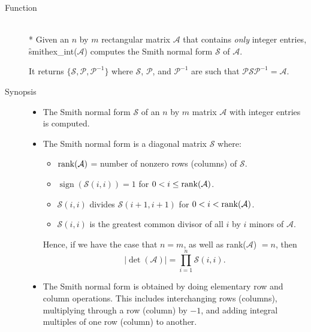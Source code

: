 \begin{description}
\item[Function]\mbox{}\\*
Given an $n$ by $m$ rectangular matrix $\mathcal{A}$ that contains
\emph{only} integer entries, \f{smithex\_int}($\mathcal{A}$) computes the
Smith normal form $\mathcal{S}$ of $\mathcal{A}$.

It returns $\{\mathcal{S}, \mathcal{P}, \mathcal{ P}^{-1}\}$ where $\mathcal{S}$,
$\mathcal{P}$, and $\mathcal{ P}^{-1}$ are such that $\mathcal{P S P}^{-1} =
\mathcal{A}$.


\item[Synopsis]

\begin{itemize}
\item The Smith normal form $\mathcal{ S}$ of an $n$ by $m$ matrix
$\mathcal{ A}$ with integer entries is computed.

\item The Smith normal form is a diagonal matrix $\mathcal{ S}$ where:

  \begin{itemize}
  \item $\mathop{\mathrm{rank}}(\mathcal{A})$ = number of nonzero rows (columns) of
        $\mathcal{S}$.
  \item $\mathop{\mathrm{sign}}(\mathcal{S}(i,i)) = 1$ for $0 < i \leq \mathop{\mathrm{rank}}(\mathcal{A})$.
  \item $\mathcal{S}(i,i)$ divides $\mathcal{S}(i+1,i+1)$ for $0< i < \mathop{\mathrm{rank}}(\mathcal{A})$.
  \item $\mathcal{S}(i,i)$ is the greatest common divisor of all $i$ by
        $i$ minors of $\mathcal{A}$.
  \end{itemize}

      Hence, if we have the case that $n = m$, as well as
      rank($\mathcal{A}$) $= n$, then
      \[
        \left|\det(\mathcal{A})\right| = \prod_{i=1}^{n} \mathcal{S}(i,i) .
      \]

\item The Smith normal form is obtained by doing elementary row and
      column operations. This includes interchanging rows (columns),
      multiplying through a row (column) by $-1$, and adding integral
      multiples of one row (column) to another.
\end{itemize}


\end{description}
